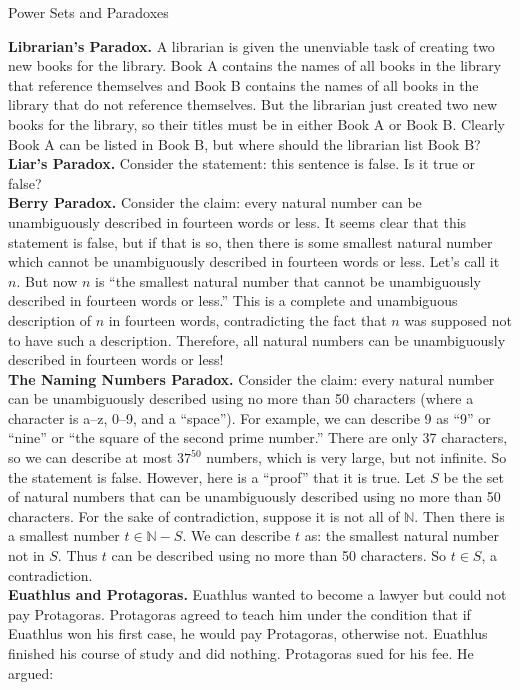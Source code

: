 \begin{section}{Power Sets and Paradoxes}
\bigskip

\noindent \textbf{Librarian's Paradox.} A librarian is given the unenviable task of creating two new books for the library. Book A contains the names of all books in the library that reference themselves and Book B contains the names of all books in the library that do not reference themselves. But the librarian just created two new books for the library, so their titles must be in either Book A or Book B. Clearly Book A can be listed in Book B, but where should the librarian list Book B?\\

\noindent \textbf{Liar's Paradox.} Consider the statement: this sentence is false. Is it true or false?\\

\noindent \textbf{Berry Paradox.} Consider the claim: every natural number can be unambiguously described in fourteen words or less. It seems clear that this statement is false, but if that is so, then there is some smallest natural number which cannot be unambiguously described in fourteen words or less. Let's call it $n$. But now $n$ is ``the smallest natural number that cannot be unambiguously described in fourteen words or less.'' This is a complete and unambiguous description of $n$ in fourteen words, contradicting the fact that $n$ was supposed not to have such a description. Therefore, all natural numbers can be unambiguously described in fourteen words or less!\\

\noindent \textbf{The Naming Numbers Paradox.} Consider the claim: every natural number can be unambiguously described using no more than 50 characters (where a character is a--z, 0--9, and a ``space''). For example, we can describe 9 as ``9'' or ``nine'' or ``the square of the second prime number.'' There are only 37 characters, so we can describe at most $37^{50}$ numbers, which is very large, but not infinite. So the statement is false. However, here is a ``proof'' that it is true. Let $S$ be the set of natural numbers that can be unambiguously described using no more than 50 characters. For the sake of contradiction, suppose it is not all of $\mathbb{N}$. Then there is a smallest number $t\in\mathbb{N}-S$. We can describe $t$ as: the smallest natural number not in $S$.  Thus $t$ can be described using no more than 50 characters. So $t\in S$, a contradiction.\\

\noindent \textbf{Euathlus and Protagoras.} Euathlus wanted to become a lawyer but could not pay Protagoras. Protagoras agreed to teach him under the condition that if Euathlus won his first case, he would pay Protagoras, otherwise not. Euathlus finished his course of study and did nothing. Protagoras sued for his fee. He argued:\\


\end{section}
